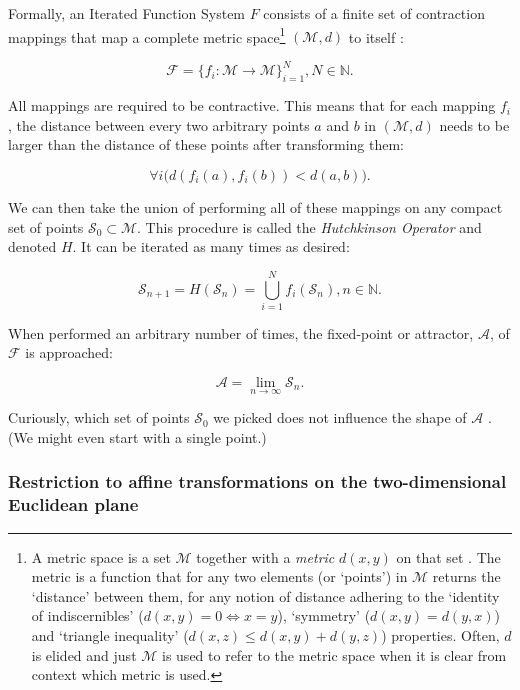 \documentclass[11pt]{article}
\begin{document}
Formally, an Iterated Function System \(F\) consists of a finite set of contraction mappings that map a complete metric space\footnote{A metric space is a set \(\mathcal{M}\) together with a \emph{metric} \(d(x, y)\) on that set . The metric is a function that for any two elements (or `points') in \(\mathcal{M}\) returns the `distance' between them, for any notion of distance adhering to the `identity of indiscernibles' (\(d(x, y)  = 0 \Leftrightarrow x = y\)), `symmetry' (\(d(x, y) = d(y, x)\)) and `triangle inequality' (\(d(x, z) \leq d(x, y) + d(y, z)\)) properties. Often, \(d\) is elided and just \(\mathcal{M}\) is used to refer to the metric space when it is clear from context which metric is used.} \((\mathcal{M}, d)\) to itself \cite{barnsley1988fractals}:

$$ \mathcal{F} = \{ f_i : \mathcal{M} \rightarrow \mathcal{M}\}_{i=1}^N, N \in \mathbb{N}.$$

All mappings are required to be contractive. This means that for each mapping \(f_i\), the distance between every two arbitrary points \(a\) and \(b\) in \((\mathcal{M}, d)\) 
needs to be larger than the distance of these points after transforming them:

$$\forall i \bigl( d(f_i(a), f_i(b)) < d(a, b) \bigr).$$

We can then take the union of performing all of these mappings on any compact set of points \(\mathcal{S}_0 \subset \mathcal{M}\). This procedure is called the \emph{Hutchkinson Operator} and denoted \(H\).
It can be iterated as many times as desired:

$$ \mathcal{S}_{n + 1} = H(\mathcal{S}_n) = \bigcup_{i=1}^{N} f_i(\mathcal{S}_n), n \in \mathbb{N}.$$

When performed an arbitrary number of times, the fixed-point or attractor, \(\mathcal{A}\), of \(\mathcal{F}\) is approached:

$$\mathcal{A} = \lim_{n \rightarrow \infty} \mathcal{S}_n.$$

Curiously, which set of points \(\mathcal{S}_0\) we picked does not influence the shape of \(\mathcal{A}\) \cite{mendivil2003fractals}. (We might even start with a single point.)

\subsubsection{Restriction to affine transformations on the two-dimensional Euclidean plane}
\label{sec:org7c5f687}

\end{document}
